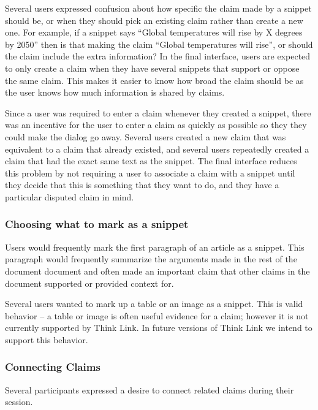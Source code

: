 \documentclass{chi2009}
\newcommand{\todo}[1]{}
\begin{document}
Several users expressed confusion about how specific the claim made by a snippet should be, or when they should pick an existing claim rather than create a new one. For example, if a snippet says ``Global temperatures will rise by X degrees by 2050'' then is that making the claim ``Global temperatures will rise'', or should the claim include the extra information? In the final interface, users are expected to only create a claim when they have several snippets that support or oppose the same claim. This makes it easier to know how broad the claim should be as the user knows how much information is shared by claims.

Since a user was required to enter a claim whenever they created a snippet, there was an incentive for the user to enter a claim as quickly as possible so they they could make the dialog go away. Several users created a new claim that was equivalent to a claim that already existed, and several users repeatedly created a claim that had the exact same text as the snippet. The final interface reduces this problem by not requiring a user to associate a claim with a snippet until they decide that this is something that they want to do, and they have a particular disputed claim in mind.

\todo{Need to do some kind of evaluation to show that the new interface solves these problems}


\subsubsection{Choosing what to mark as a snippet}

Users would frequently mark the first paragraph of an article as a snippet. This paragraph would frequently summarize the arguments made in the rest of the document document and often made an important claim that other claims in the document supported or provided context for. 

Several users wanted to mark up a table or an image as a snippet. This is valid behavior -- a table or image is often useful evidence for a claim; however it is not currently supported by Think Link. In future versions of Think Link we intend to support this behavior.


\subsubsection{Connecting Claims}

Several participants expressed a desire to connect related claims during their session. 
\end{document}
